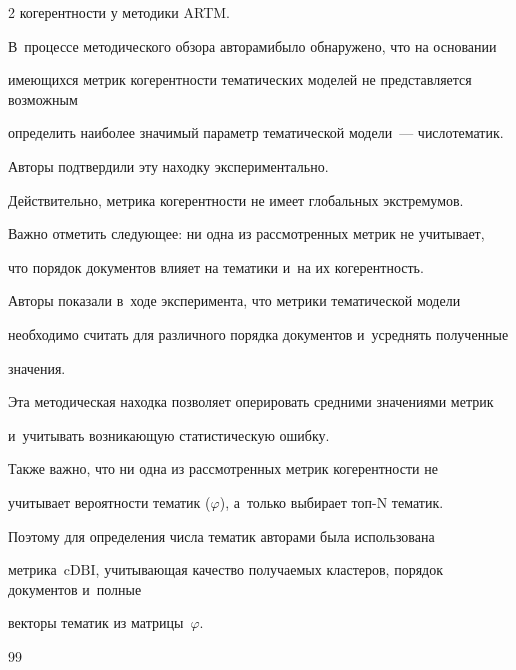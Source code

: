\begin{multicols}{2}
когерентности у методики ARTM.


    


    В~процессе методического обзора авторами\linebreak было обнаружено, что на основании 


имеющихся мет\-рик когерентности тематических моделей не представляется возможным 


определить наиболее значимый параметр тематической модели~--- число\linebreak тематик.


    Авторы подтвердили эту находку экспериментально.


    Действительно, метрика когерентности не имеет глобальных экстремумов.


    Важно отметить следующее: ни одна из рассмотренных метрик не учитывает, 


что порядок документов влияет на тематики и~на их когерентность.


    Авторы показали в~ходе эксперимента, что метрики тематической модели 


необходимо считать для различного порядка документов и~усреднять полученные 


значения.


    Эта методическая находка позволяет оперировать средними значениями метрик 


и~учитывать возникающую статистическую ошибку.


    Также важно, что ни одна из рассмотренных метрик когерентности  не 


учитывает вероятности тематик ($\varphi$), а~только выбирает топ-N  тематик.


    Поэтому для определения числа тематик авторами была использована 


    мет\-ри\-ка~$\mathrm{cDBI}$, учитывающая качество получаемых кластеров, порядок документов и~полные 


векторы тематик из мат\-ри\-цы~$\varphi$.


    


{\small\frenchspacing


 {%




 \begin{thebibliography}{99}






\end{thebibliography}}}
\end{multicols}

